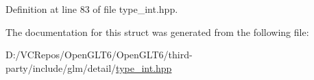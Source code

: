 Definition at line 83 of file type\+\_\+int.\+hpp.



The documentation for this struct was generated from the following file\+:\begin{DoxyCompactItemize}
\item 
D\+:/\+V\+C\+Repos/\+Open\+G\+L\+T6/\+Open\+G\+L\+T6/third-\/party/include/glm/detail/\mbox{\hyperlink{type__int_8hpp}{type\+\_\+int.\+hpp}}\end{DoxyCompactItemize}
